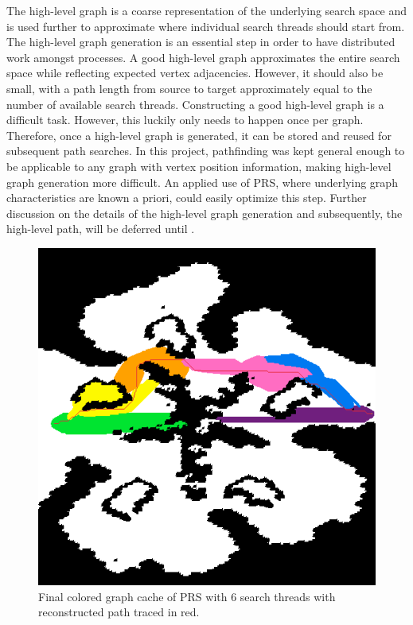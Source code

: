 The high-level graph is a coarse representation of the underlying search space and is used further to approximate where individual search threads should start from.
The high-level graph generation is an essential step in order to have distributed work amongst processes. 
A good high-level graph approximates the entire search space while reflecting expected vertex adjacencies. 
However, it should also be small, with a path length from source to target approximately equal to the number of available search threads.
Constructing a good high-level graph is a difficult task. However, this luckily only needs to happen once per graph. 
Therefore, once a high-level graph is generated, it can be stored and reused for subsequent path searches.
In this project, pathfinding was kept general enough to be applicable to any graph with vertex position information, making high-level graph generation more difficult. An applied use of PRS, where underlying graph characteristics are known a priori, could easily optimize this step. 
Further discussion on the details of the high-level graph generation and subsequently, the high-level path, will be deferred until .

\begin{figure}[H]
    \centering
    \includegraphics[width=.5\linewidth]{img/ripple.png}
    \caption{Final colored graph cache of PRS with 6 search threads with reconstructed path traced in red.}
    \label{fig:ripple_example}
\end{figure}

